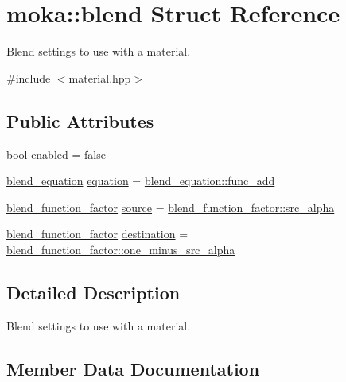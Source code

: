 \hypertarget{structmoka_1_1blend}{}\section{moka\+::blend Struct Reference}
\label{structmoka_1_1blend}


Blend settings to use with a material.  




{\ttfamily \#include $<$material.\+hpp$>$}

\subsection*{Public Attributes}
\begin{DoxyCompactItemize}
\item 
bool \mbox{\hyperlink{structmoka_1_1blend_ab32b3e6763ad8210e06a5569f5a789ae}{enabled}} = false
\item 
\mbox{\hyperlink{namespacemoka_acf03408f89c521244763fb5f8746ce16}{blend\+\_\+equation}} \mbox{\hyperlink{structmoka_1_1blend_aeb187f38046e0eacb02e82737c744f1a}{equation}} = \mbox{\hyperlink{namespacemoka_acf03408f89c521244763fb5f8746ce16ae356d88a1e5f1a9a32dcc057d706021a}{blend\+\_\+equation\+::func\+\_\+add}}
\item 
\mbox{\hyperlink{namespacemoka_a631c77633ed9ed0c34a6632a8211a19d}{blend\+\_\+function\+\_\+factor}} \mbox{\hyperlink{structmoka_1_1blend_a61a0f7f6eecc7af34fd9b2b993b729c7}{source}} = \mbox{\hyperlink{namespacemoka_a631c77633ed9ed0c34a6632a8211a19daff175e9d424fcb3eef837a773872fb9e}{blend\+\_\+function\+\_\+factor\+::src\+\_\+alpha}}
\item 
\mbox{\hyperlink{namespacemoka_a631c77633ed9ed0c34a6632a8211a19d}{blend\+\_\+function\+\_\+factor}} \mbox{\hyperlink{structmoka_1_1blend_a3dc6df59190a9aafd10498c846ccb921}{destination}} = \mbox{\hyperlink{namespacemoka_a631c77633ed9ed0c34a6632a8211a19daa415ef353601f5e5d8a3e5ac06683703}{blend\+\_\+function\+\_\+factor\+::one\+\_\+minus\+\_\+src\+\_\+alpha}}
\end{DoxyCompactItemize}


\subsection{Detailed Description}
Blend settings to use with a material. 

\subsection{Member Data Documentation}
\mbox{\label{structmoka_1_1blend_a3dc6df59190a9aafd10498c846ccb921}} 
